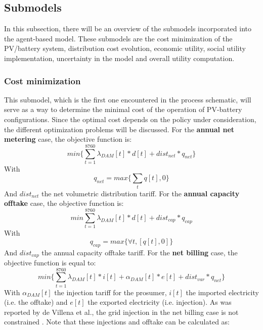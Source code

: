 \subsection{Submodels} \label{submodel}
In this subsection, there will be an overview of the submodels incorporated into the agent-based model. These submodels are the cost minimization of the PV/battery system, distribution cost evolution, economic utility, social utility implementation, uncertainty in the model and overall utility computation.
\subsubsection{Cost minimization}
This submodel, which is the first one encountered in the process schematic, will serve as a way to determine the minimal cost of the operation of PV-battery configurations. Since the optimal cost depends on the policy under consideration, the different optimization problems will be discussed.
\newline \newline \noindent
For the \textbf{annual net metering} case, the objective function is:
\begin{equation}
    min\{\sum_{t=1}^{8760} \lambda_{DAM}[t]*d[t] + dist_{net}*q_{net}\}
\end{equation}
With 
\begin{equation} \label{qnet}
    q_{net} = max\{\sum_{t} q[t] , 0 \}
\end{equation}
\noindent   
And $dist_{net}$ the net volumetric distribution tariff. For the \textbf{annual capacity offtake} case, the objective function is:
\begin{equation}
    min{{\sum_{t=1}^{8760} \lambda_{DAM}[t]*d[t]}} + dist_{cap}*q_{cap}
\end{equation}
With 
\begin{equation}
    q_{cap} = max\{ \forall t, [q[t],0]\}
\end{equation}
And $dist_{cap}$ the annual capacity offtake tariff. For the \textbf{net billing} case, the objective function is equal to:
\begin{equation} \label{voleq}
        min\{\sum_{t=1}^{8760} \lambda_{DAM}[t]*i[t] + \alpha_{DAM}[t]*e[t]  + dist_{var}*q_{net}\}
\end{equation}
With $\alpha_{DAM}[t]$ the injection tariff for the prosumer,  $i[t]$ the imported electricity (i.e. the offtake) and $e[t]$ the exported electricity (i.e. injection). As was reported by de Villena et al., the grid injection in the net billing case is not constrained \cite{Regulation}. Note that these injections and offtake can be calculated as:
